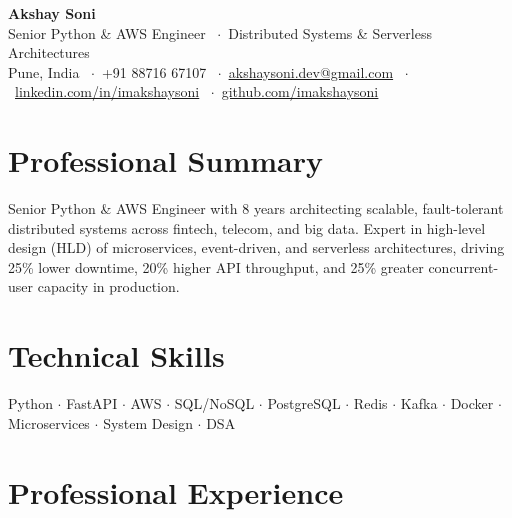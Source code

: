 \documentclass[10pt, letterpaper]{article}
\begin{document}

\begin{center}
  {\LARGE\bfseries\color{darktext} Akshay Soni}\\[4pt]
  {\color{accentblue}
    Senior Python \& AWS Engineer
    \ $\cdot$\
    Distributed Systems \& Serverless Architectures
  }\\[4pt]
  {\small\color{graytext}
    Pune, India
    \ $\cdot$\
    +91 88716 67107
    \ $\cdot$\
    \href{mailto:akshaysoni460@gmail.com}{\underline{akshaysoni.dev@gmail.com}}
    \ $\cdot$\
    \href{https://linkedin.com/in/imakshaysoni}{\underline{linkedin.com/in/imakshaysoni}}
    \ $\cdot$\
    \href{https://github.com/imakshaysoni}{\underline{github.com/imakshaysoni}}
  }
\end{center}

\vspace{2pt}

\section{Professional Summary}

Senior Python \& AWS Engineer with 8 years architecting scalable, fault-tolerant distributed systems across fintech, telecom, and big data. Expert in high-level design (HLD) of microservices, event-driven, and serverless architectures, driving 25\% lower downtime, 20\% higher API throughput, and 25\% greater concurrent-user capacity in production.

\vspace{2pt}
\section{Technical Skills}

Python $\cdot$ FastAPI $\cdot$ AWS $\cdot$ SQL/NoSQL $\cdot$ PostgreSQL $\cdot$ Redis $\cdot$ Kafka $\cdot$ Docker $\cdot$ Microservices $\cdot$ System Design $\cdot$ DSA

\vspace{2pt}
\section{Professional Experience}
\end{document}
